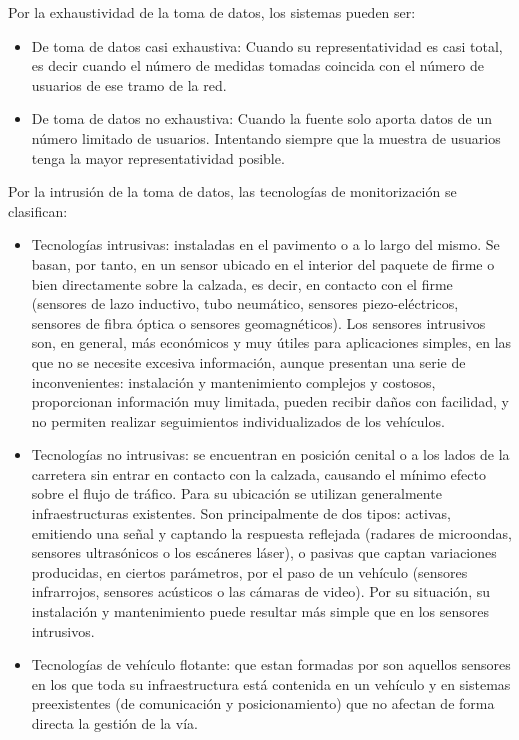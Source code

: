 \documentclass[twocolumn,twoside]{Jornadas}
\begin{document}
Por la exhaustividad de la toma de datos, los sistemas pueden ser:

\begin{itemize}

 \item De toma de datos casi exhaustiva: Cuando su representatividad es casi total, es decir cuando el número de medidas tomadas coincida con el número de 
usuarios de ese tramo de la red.

 \item De toma de datos no exhaustiva: Cuando la fuente solo aporta datos de un número limitado de usuarios. Intentando siempre que la muestra de usuarios tenga la mayor representatividad posible.
 
\end{itemize}

Por la intrusión de la toma de datos, las tecnologías de monitorización se clasifican:

\begin{itemize}
 \item Tecnologías intrusivas: instaladas en el pavimento o a lo largo del mismo. Se basan, por tanto, en un sensor ubicado en el interior del 
paquete de firme o bien directamente sobre la calzada, es decir, en contacto con el firme (sensores de lazo inductivo, tubo neumático, 
sensores piezo-eléctricos, sensores de fibra óptica o sensores geomagnéticos). Los sensores intrusivos son, en general, más económicos 
y muy útiles para aplicaciones simples, en las que no se necesite excesiva información, aunque presentan una serie de inconvenientes: instalación y mantenimiento complejos y costosos, proporcionan información muy limitada, pueden recibir daños con facilidad, y no permiten realizar seguimientos individualizados de los vehículos.

 \item Tecnologías no intrusivas: se encuentran en posición cenital o a los lados de la carretera sin entrar en contacto con la calzada, 
causando el mínimo efecto sobre el flujo de tráfico. Para su ubicación se utilizan generalmente infraestructuras existentes. 
Son principalmente de dos tipos: activas, emitiendo una señal y captando la respuesta reflejada (radares de microondas, 
sensores ultrasónicos o los escáneres láser), o pasivas que captan variaciones producidas, en ciertos parámetros, 
por el paso de un vehículo (sensores infrarrojos, sensores acústicos o las cámaras de video). 
Por su situación, su instalación y mantenimiento puede resultar más simple que en los sensores intrusivos.

 \item Tecnologías de vehículo flotante: que estan formadas por son aquellos sensores en los que toda su infraestructura está contenida en un 
vehículo y en sistemas preexistentes (de comunicación y posicionamiento) que no afectan de forma directa la gestión de la vía.

\end{itemize}
\end{document}
